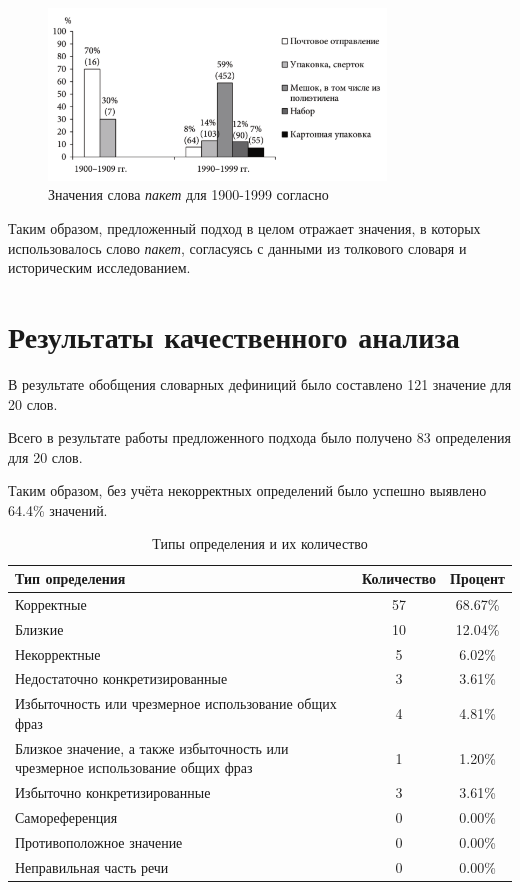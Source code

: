 \documentclass[LI,VKR]{HSEUniversity}
\begin{document}
\begin{figure}[H]
    \centering %
    \includegraphics[width=0.8\textwidth]{img/book/paket/1900-1999}
    \caption{Значения слова \textit{пакет} для 1900-1999 согласно~\cite{TwoCenturies}}
    \label{TwoCenturiesPaket}
\end{figure}

Таким образом, предложенный подход в целом отражает значения, в которых использовалось
слово \textit{пакет}, согласуясь с данными из толкового словаря и историческим исследованием.

\section{Результаты качественного анализа}

В результате обобщения словарных дефиниций было составлено 121 значение для 20 слов.

Всего в результате работы предложенного подхода было получено 83 определения для 20 слов. %

Таким образом, без учёта некорректных определений было успешно выявлено
64.4\% значений.

\begin{table}[H]
\centering
\caption{Типы определения и их количество}
\begin{tabular}{|>{\raggedright\arraybackslash}p{8cm}|c|c|}
\hline
\textbf{Тип определения} & \textbf{Количество} & \textbf{Процент} \\ \hline
Корректные & 57 & 68.67\% \\ \hline %
Близкие & 10 & 12.04\% \\ \hline %
Некорректные & 5 & 6.02\% \\ \hline %
Недостаточно конкретизированные & 3 & 3.61\% \\ \hline %
Избыточность или чрезмерное использование общих фраз & 4 & 4.81\% \\ \hline
Близкое значение, а также избыточность или чрезмерное использование общих фраз & 1 & 1.20\% \\ \hline
Избыточно конкретизированные & 3 & 3.61\% \\ \hline
Самореференция & 0 & 0.00\% \\ \hline
Противоположное значение & 0 & 0.00\% \\ \hline
Неправильная часть речи & 0 & 0.00\% \\ \hline
\end{tabular}
\end{table}
\end{document}
